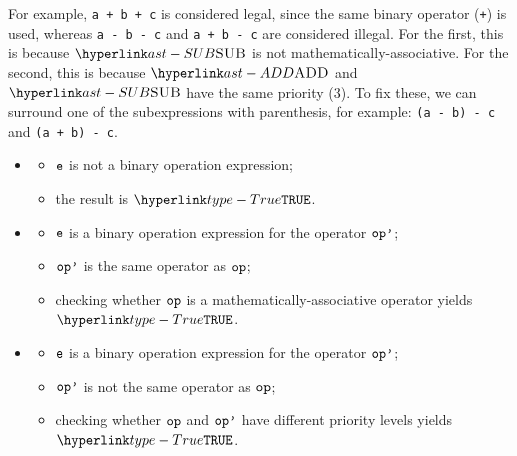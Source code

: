 For example, \texttt{a + b + c} is considered legal, since the same binary operator (\texttt{+})
is used, whereas \texttt{a - b - c} and \texttt{a + b - c} are considered illegal.
For the first, this is because $\SUB$ is not mathematically-associative.
For the second, this is because $\ADD$ and $\SUB$ have the
same priority ($3$). To fix these, we can surround one of the subexpressions with parenthesis,
for example: \texttt{(a - b) - c} and \texttt{(a + b) - c}.

\ProseParagraph
\OneApplies
\begin{itemize}
  \item {}
  \begin{itemize}
    \item $\texttt{e}$ is not a binary operation expression;
    \item the result is $\True$.
  \end{itemize}

  \item {}
  \begin{itemize}
    \item $\texttt{e}$ is a binary operation expression for the operator $\texttt{op'}$;
    \item $\texttt{op'}$ is the same operator as $\texttt{op}$;
    \item checking whether $\texttt{op}$ is a mathematically-associative operator yields $\True$\ProseTerminateAs{\BinopPriority}.
  \end{itemize}

  \item {}
  \begin{itemize}
    \item $\texttt{e}$ is a binary operation expression for the operator $\texttt{op'}$;
    \item $\texttt{op'}$ is not the same operator as $\texttt{op}$;
    \item checking whether $\texttt{op}$ and $\texttt{op'}$ have different priority levels yields $\True$\ProseTerminateAs{\BinopPriority}.
  \end{itemize}
\end{itemize}

\FormallyParagraph
\begin{mathpar}
\end{mathpar}


